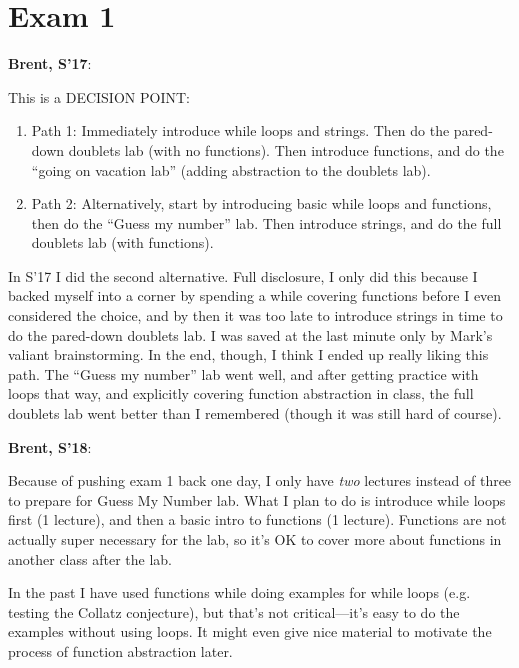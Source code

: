 \documentclass{article}
\newenvironment{reflect}[1]
{
  \noindent
  \begin{lrbox}{\reflectbox}
    \begin{minipage}[t]{\textwidth}
      \textbf{#1}:
}{
    \end{minipage}
  \end{lrbox}
  \fbox{\usebox{\reflectbox}}
}
\begin{document}
\section{Exam 1}

\newpage

\begin{reflect}{Brent, S'17}
  This is a DECISION POINT:
  \begin{enumerate}
  \item Path 1: Immediately introduce while loops and strings.  Then
    do the pared-down doublets lab (with no functions).  Then
    introduce functions, and do the ``going on vacation lab'' (adding
    abstraction to the doublets lab).
  \item Path 2: Alternatively, start by introducing basic while loops
    and functions, then do the ``Guess my number'' lab.  Then
    introduce strings, and do the full doublets lab (with functions).
  \end{enumerate}

  In S'17 I did the second alternative.  Full disclosure, I only did
  this because I backed myself into a corner by spending a while
  covering functions before I even considered the choice, and by then
  it was too late to introduce strings in time to do the pared-down
  doublets lab.  I was saved at the last minute only by Mark's valiant
  brainstorming.  In the end, though, I think I ended up really liking
  this path.  The ``Guess my number'' lab went well, and after getting
  practice with loops that way, and explicitly covering function
  abstraction in class, the full doublets lab went better than I
  remembered (though it was still hard of course).
\end{reflect}

\begin{reflect}{Brent, S'18}
  Because of pushing exam 1 back one day, I only have \emph{two}
  lectures instead of three to prepare for Guess My Number lab.  What
  I plan to do is introduce while loops first (1 lecture), and then a
  basic intro to functions (1 lecture).  Functions are not actually
  super necessary for the lab, so it's OK to cover more about
  functions in another class after the lab.

  In the past I have used functions while doing examples for while
  loops (e.g. testing the Collatz conjecture), but that's not
  critical---it's easy to do the examples without using loops.  It
  might even give nice material to motivate the process of function
  abstraction later.
\end{reflect}
\end{document}
